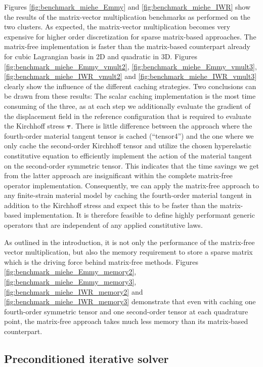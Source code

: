 \documentclass[preprint,12pt,times]{elsarticle}
\def\gz  #1{           \mbox{$\boldsymbol{#1}$}}
\begin{document}
Figures \ref{fig:benchmark_miehe_Emmy} and \ref{fig:benchmark_miehe_IWR} show the results of the matrix-vector multiplication benchmarks as performed on the two clusters.
As expected, the matrix-vector multiplication becomes very expensive for higher order discretization for sparse matrix-based approaches.
The matrix-free implementation is faster than the matrix-based counterpart already for cubic Lagrangian basis in 2D and quadratic in 3D.
Figures \ref{fig:benchmark_miehe_Emmy_vmult2}, \ref{fig:benchmark_miehe_Emmy_vmult3}, \ref{fig:benchmark_miehe_IWR_vmult2} and \ref{fig:benchmark_miehe_IWR_vmult3} clearly show the influence of the different caching strategies.
Two conclusions can be drawn from these results:
The scalar caching implementation is the most time consuming of the three, as at each step we additionally evaluate the gradient of the displacement field in the reference configuration that is required to evaluate the Kirchhoff stress $\gz \tau$.
There is little difference between the approach where the fourth-order material tangent tensor is cached (``tensor4'') and the one where we only cache the second-order Kirchhoff tensor and utilize the chosen hyperelastic constitutive equation to efficiently implement the action of the material tangent on the second-order symmetric tensor.
This indicates that the time savings we get from the latter approach are insignificant within the complete matrix-free operator implementation.
Consequently, we can apply the matrix-free approach to any finite-strain material model by caching the fourth-order material tangent in addition to the Kirchhoff stress and expect this to be faster than the matrix-based implementation.
It is therefore feasible to define highly performant generic operators that are independent of any applied constitutive laws.

As outlined in the introduction, it is not only the performance of the matrix-free vector multiplication, but also the memory requirement to store a sparse matrix which is the driving force behind matrix-free methods.
Figures \ref{fig:benchmark_miehe_Emmy_memory2}, \ref{fig:benchmark_miehe_Emmy_memory3}, \ref{fig:benchmark_miehe_IWR_memory2} and \ref{fig:benchmark_miehe_IWR_memory3} demonstrate that even with caching one fourth-order symmetric tensor and one second-order tensor at each quadrature point, the matrix-free approach takes much less memory than its matrix-based counterpart.

\subsection{Preconditioned iterative solver}
\end{document}
